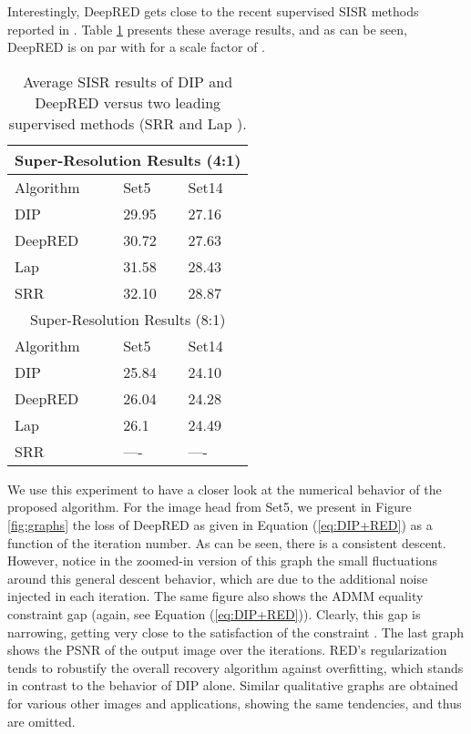 \documentclass[12pt]{article}
\begin{document}
Interestingly, DeepRED gets close to the recent supervised SISR methods reported in \cite{LapSRN,SRresnet}. Table \ref{Tab:Supervised} presents these average results, and as can be seen, DeepRED is on par with \cite{LapSRN} for a scale factor of . 

\begin{table}[htbp]
\centering
 \footnotesize\addtolength{\tabcolsep}{-5pt}
\begin{tabularx}{\linewidth}{|X||X X|}
\hline
 \multicolumn{3}{|c|}{Super-Resolution Results (4:1)} \\
 \hline
 Algorithm & \textsf{Set5} & \textsf{Set14} \\ [0.1ex] 
 \hline
DIP & 29.95 & 27.16 \\
DeepRED & 30.72 & 27.63 \\
Lap & 31.58 & 28.43 \\
SRR & 32.10 & 28.87 \\
\hline
 \multicolumn{3}{|c|}{Super-Resolution Results (8:1)} \\
 \hline
 Algorithm & \textsf{Set5} & \textsf{Set14} \\ [0.1ex] 
 \hline
DIP & 25.84 & 24.10 \\
DeepRED & 26.04 & 24.28 \\
Lap & 26.1 & 24.49 \\
SRR & ---- & ---- \\
 \hline
\end{tabularx}
\caption{Average SISR results of DIP and DeepRED versus two leading supervised methods (SRR \cite{SRresnet} and Lap \cite{LapSRN}).}
\label{Tab:Supervised}
\end{table}



We use this experiment to have a closer look at the numerical behavior of the proposed algorithm. For the image \textsf{head} from \textsf{Set5}, we present in Figure \ref{fig:graphs} the loss of DeepRED as given in Equation (\ref{eq:DIP+RED}) as a function of the iteration number. As can be seen, there is a consistent descent. However, notice in the zoomed-in version of this graph the small fluctuations around this general descent behavior, which are due to the additional noise injected in each iteration. The same figure also shows the ADMM equality constraint gap (again, see Equation (\ref{eq:DIP+RED})). Clearly, this gap is narrowing, getting very close to the satisfaction of the constraint . The last graph shows the PSNR of the output image over the iterations. RED's regularization tends to robustify the overall recovery algorithm against overfitting, which stands in contrast to the behavior of DIP alone. Similar qualitative graphs are obtained for various other images and applications, showing the same tendencies, and thus are omitted. 
\end{document}
